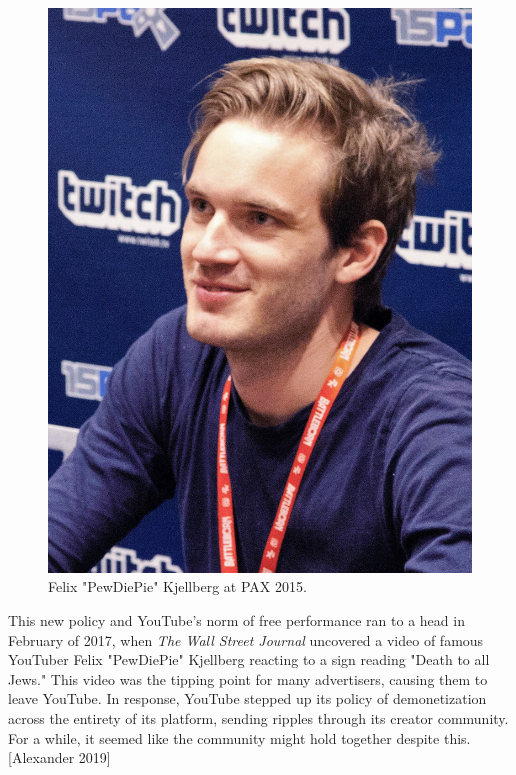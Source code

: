 \documentclass[class=book, crop=false]{standalone}
\begin{document}
\begin{figure}[!tbp]
  \centering
  \begin{minipage}[b]{0.4\textwidth}
    \includegraphics[width=\textwidth]{pewdiepie}
    \caption{Felix "PewDiePie" Kjellberg at PAX 2015.}
  \end{minipage}
\end{figure}

This new policy and YouTube's norm of free performance ran to a head in February of 2017, when \textit{The Wall Street Journal} uncovered a video of famous YouTuber Felix "PewDiePie" Kjellberg reacting to a sign reading "Death to all Jews." This video was the tipping point for many advertisers, causing them to leave YouTube. In response, YouTube stepped up its policy of demonetization across the entirety of its platform, sending ripples through its creator community. For a while, it seemed like the community might hold together despite this. [Alexander 2019]
\end{document}

